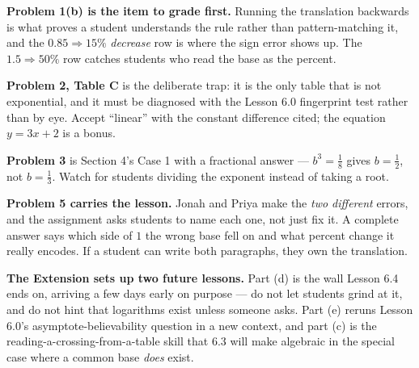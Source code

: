 \documentclass[10pt]{article}
\begin{document}
\begin{teachernote}
\textbf{Problem 1(b) is the item to grade first.} Running the translation backwards is what proves a
student understands the rule rather than pattern-matching it, and the $0.85 \Rightarrow 15\%$
\emph{decrease} row is where the sign error shows up. The $1.5 \Rightarrow 50\%$ row catches students
who read the base as the percent.

\textbf{Problem 2, Table C} is the deliberate trap: it is the only table that is not exponential, and
it must be diagnosed with the Lesson 6.0 fingerprint test rather than by eye. Accept ``linear'' with
the constant difference cited; the equation $y=3x+2$ is a bonus.

\textbf{Problem 3} is Section 4's Case 1 with a fractional answer --- $b^{3}=\frac18$ gives
$b=\frac12$, not $b=\frac13$. Watch for students dividing the exponent instead of taking a root.

\textbf{Problem 5 carries the lesson.} Jonah and Priya make the \emph{two different} errors, and the
assignment asks students to name each one, not just fix it. A complete answer says which side of $1$
the wrong base fell on and what percent change it really encodes. If a student can write both
paragraphs, they own the translation.

\textbf{The Extension sets up two future lessons.} Part (d) is the wall Lesson 6.4 ends on, arriving
a few days early on purpose --- do not let students grind at it, and do not hint that logarithms
exist unless someone asks. Part (e) reruns Lesson 6.0's asymptote-believability question in a new
context, and part (c) is the reading-a-crossing-from-a-table skill that 6.3 will make algebraic in
the special case where a common base \emph{does} exist.
\end{teachernote}
\end{document}
